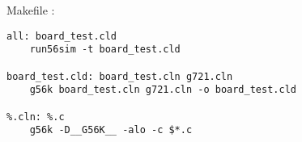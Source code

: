 Makefile :

\begin{verbatim}
all: board_test.cld
	run56sim -t board_test.cld

board_test.cld: board_test.cln g721.cln
	g56k board_test.cln g721.cln -o board_test.cld

%.cln: %.c
	g56k -D__G56K__ -alo -c $*.c
\end{verbatim}

